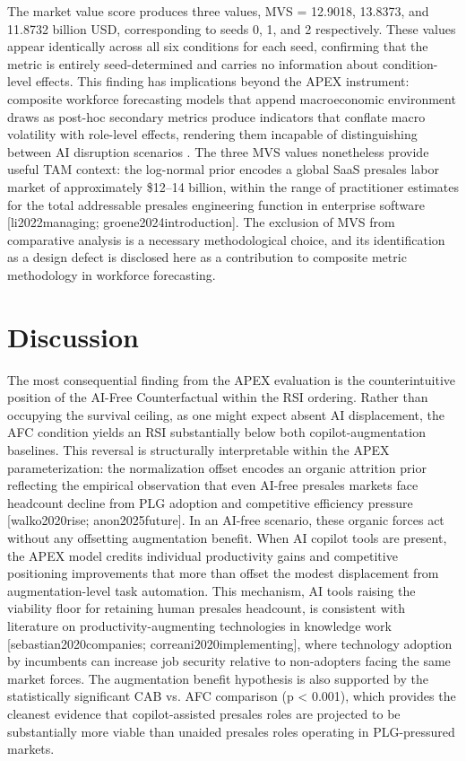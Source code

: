\documentclass[10pt, conference]{IEEEtran}
\begin{document}
\label{sec:secondary_metric_findings}

The market value score produces three values, MVS = 12.9018, 13.8373, and 11.8732 billion USD, corresponding to seeds 0, 1, and 2 respectively. These values appear identically across all six conditions for each seed, confirming that the metric is entirely seed-determined and carries no information about condition-level effects. This finding has implications beyond the APEX instrument: composite workforce forecasting models that append macroeconomic environment draws as post-hoc secondary metrics produce indicators that conflate macro volatility with role-level effects, rendering them incapable of distinguishing between AI disruption scenarios \cite{virtanen2020scipy}. The three MVS values nonetheless provide useful TAM context: the log-normal prior encodes a global SaaS presales labor market of approximately \$12--14 billion, within the range of practitioner estimates for the total addressable presales engineering function in enterprise software [li2022managing; groene2024introduction]. The exclusion of MVS from comparative analysis is a necessary methodological choice, and its identification as a design defect is disclosed here as a contribution to composite metric methodology in workforce forecasting.

\section{Discussion}

\label{sec:discussion}

The most consequential finding from the APEX evaluation is the counterintuitive position of the AI-Free Counterfactual within the RSI ordering. Rather than occupying the survival ceiling, as one might expect absent AI displacement, the AFC condition yields an RSI substantially below both copilot-augmentation baselines. This reversal is structurally interpretable within the APEX parameterization: the normalization offset encodes an organic attrition prior reflecting the empirical observation that even AI-free presales markets face headcount decline from PLG adoption and competitive efficiency pressure [walko2020rise; anon2025future]. In an AI-free scenario, these organic forces act without any offsetting augmentation benefit. When AI copilot tools are present, the APEX model credits individual productivity gains and competitive positioning improvements that more than offset the modest displacement from augmentation-level task automation. This mechanism, AI tools raising the viability floor for retaining human presales headcount, is consistent with literature on productivity-augmenting technologies in knowledge work [sebastian2020companies; correani2020implementing], where technology adoption by incumbents can increase job security relative to non-adopters facing the same market forces. The augmentation benefit hypothesis is also supported by the statistically significant CAB vs. AFC comparison (p < 0.001), which provides the cleanest evidence that copilot-assisted presales roles are projected to be substantially more viable than unaided presales roles operating in PLG-pressured markets.
\end{document}
